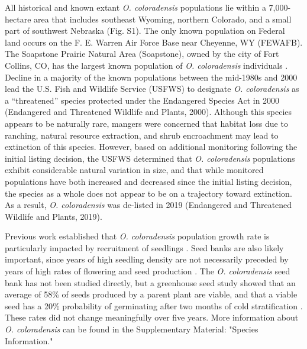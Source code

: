 \documentclass[12pt, letterpaper]{article}
\begin{document}
All historical and known extant \textit{O. coloradensis} populations lie within a 7,000-hectare area that includes southeast Wyoming, northern Colorado, and a small part of southwest Nebraska (Fig. S1). The only known population on Federal land occurs on the F. E. Warren Air Force Base near Cheyenne, WY (FEWAFB). The Soapstone Prairie Natural Area (Soapstone), owned by the city of Fort Collins, CO, has the largest known population of \textit{O. coloradensis} individuals \cite{Heidel202133-YearWyoming}. Decline in a majority of the known populations between the mid-1980s and 2000 lead the U.S. Fish and Wildlife Service (USFWS) to designate \textit{O. coloradensis} as a “threatened” species protected under the Endangered Species Act in 2000 (Endangered and Threatened Wildlife and Plants, 2000). Although this species appears to be naturally rare, mangers were concerned that habitat loss due to ranching, natural resource extraction, and shrub encroachment may lead to extinction of this species. However, based on additional monitoring following the initial listing decision, the USFWS determined that \textit{O. coloradensis} populations exhibit considerable natural variation in size, and that while monitored populations have both increased and decreased since the initial listing decision, the species as a whole does not appear to be on a trajectory toward extinction. As a result, \textit{O. coloradensis} was de-listed in 2019 (Endangered and Threatened Wildlife and Plants, 2019).
\nocite{USFWS2019}
\nocite{USFWS2000}

Previous work established that \textit{O. coloradensis} population growth rate is particularly impacted by recruitment of seedlings \cite{Floyd1998}. Seed banks are also likely important, since years of high seedling density are not necessarily preceded by years of high rates of flowering and seed production \cite{Munk2002RosetteSpecies, Heidel202133-YearWyoming}. The \textit{O. coloradensis} seed bank has not been studied directly, but a greenhouse seed study showed that an average of 58\% of seeds produced by a parent plant are viable, and that a viable seed has a 20\% probability of germinating after two months of cold stratification \cite{Burgess2005CapsuleColoradensis}. These rates did not change meaningfully over five years. More information about \textit{O. coloradensis} can be found in the Supplementary Material: "Species Information."
\end{document}
